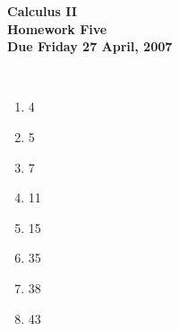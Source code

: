 \documentclass[12pt]{article}
\begin{document}
\pagestyle{empty}
 
\begin{center}
{\large {\bf Calculus II}}\\
\medskip
{\large {\bf Homework Five}}\\
\medskip
{ {\bf Due Friday 27 April, 2007}}\\
\end{center}

\hspace{2mm}\\


\begin{enumerate}
\setlength{\itemsep}{-1mm}
    \item 4
  \item 5
  \item 7 
  \item 11
  \item 15
  \item 35
  \item 38
  \item 43
\end{enumerate}
\end{document}

